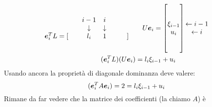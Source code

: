 \begin{displaymath}
\begin{split}
	\begin{matrix}
		& & i-1 & i  \\
		& & \downarrow & \downarrow \\
		\boldsymbol{e}_{i}^{T}L = [& & l_{i} & 1 & & &]
	\end{matrix}
	\quad & \quad
	U \boldsymbol{e}_{i} = \begin{bmatrix}
		\\ 
		\\ 
		\xi_{i-1} \\ 
		u_{i} \\
	 	\\
	 	\\
	\end{bmatrix} 
	\begin{matrix}
		\\ 
		\\  
		\leftarrow i-1 \\
		\leftarrow i \\
	 	\\
	 	\\
	\end{matrix} \\
	(\boldsymbol{e}_{i}^{T}L )(U \boldsymbol{e}_{i}) &= l_{i} \xi_{i-1} + u_{i} 
\end{split}
\end{displaymath}
Usando ancora la propriet\`a di diagonale dominanza deve valere:
\begin{displaymath}
	(\boldsymbol{e}_{i}^{T} A \boldsymbol{e}_{i}) = 2 = l_{i} \xi_{i-1} + u_{i}
\end{displaymath}
Rimane da far vedere che la matrice dei coefficienti (la chiamo $A$) \`e

